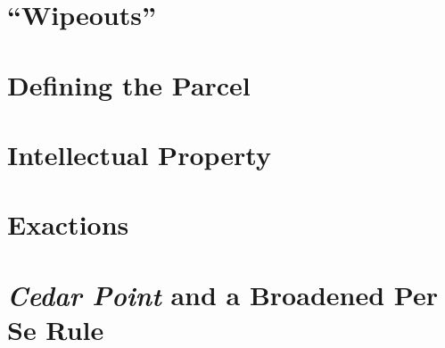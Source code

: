 




\begin{questions}

\end{questions}





\begin{questions}

\end{questions}


\section{``Wipeouts''}





\begin{questions}

\end{questions}





\begin{questions}

\end{questions}


\section{Defining the Parcel}







\begin{questions}

\end{questions}


\section{Intellectual Property}




\section{Exactions}









\begin{questions}

\end{questions}



\section{\textit{Cedar Point} and a Broadened Per Se Rule}






\begin{questions}

\end{questions}
